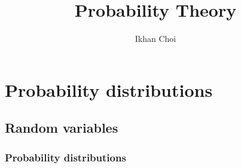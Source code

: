 \documentclass{../note}
\begin{document}
\title{Probability Theory}
\author{Ikhan Choi}
\maketitle
\tableofcontents


\part{Probability distributions}


\chapter{Random variables}

\section{Probability distributions}
\end{document}
